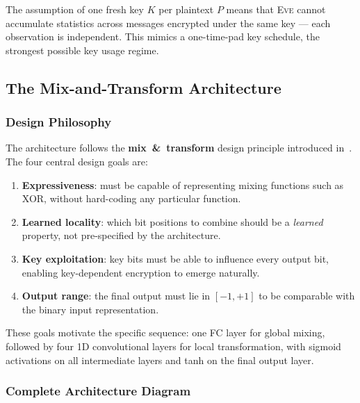 \documentclass[12pt, a4paper]{article}
\newcommand{\eve}{\textsc{Eve}}
\begin{document}
The assumption of one fresh key $K$ per plaintext $P$ means that
\eve{} cannot accumulate statistics across messages encrypted under
the same key --- each observation is independent. This mimics a
one-time-pad key schedule, the strongest possible key usage regime.

\subsection{The Mix-and-Transform Architecture}
\label{subsec:mix_transform}

\subsubsection*{Design Philosophy}

The architecture follows the \textbf{mix~\&~transform} design principle
introduced in~\cite{abadi2016learning}. The four central design goals are:

\begin{enumerate}[leftmargin=2em, itemsep=4pt]
  \item \textbf{Expressiveness}: must be capable of representing mixing
        functions such as XOR, without hard-coding any particular function.
  \item \textbf{Learned locality}: which bit positions to combine should
        be a \emph{learned} property, not pre-specified by the architecture.
  \item \textbf{Key exploitation}: key bits must be able to influence every
        output bit, enabling key-dependent encryption to emerge naturally.
  \item \textbf{Output range}: the final output must lie in $[-1,+1]$
        to be comparable with the binary input representation.
\end{enumerate}

These goals motivate the specific sequence: one FC layer for global
mixing, followed by four 1D convolutional layers for local transformation,
with sigmoid activations on all intermediate layers and tanh on the final
output layer.

\subsubsection*{Complete Architecture Diagram}
\end{document}
